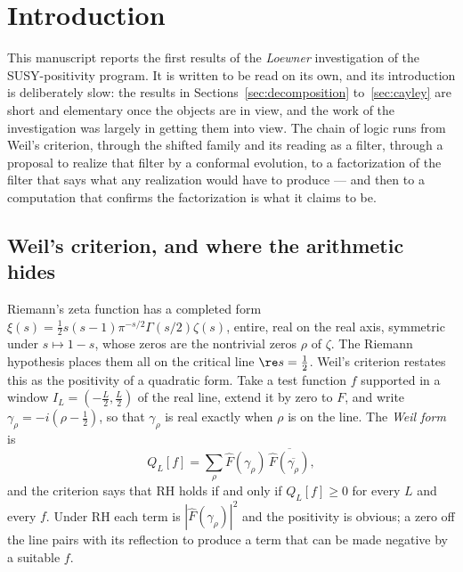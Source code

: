 \section{Introduction}\label{sec:intro}

This manuscript reports the first results of the \emph{Loewner} investigation
of the SUSY-positivity program. It is written to be read on its own, and its
introduction is deliberately slow: the results in Sections~\ref{sec:decomposition}
to~\ref{sec:cayley} are short and elementary once the objects are in
view, and the work of the investigation was largely in getting them into view.
The chain of logic runs from Weil's criterion, through the shifted family and
its reading as a filter, through a proposal to realize that filter by a
conformal evolution, to a factorization of the filter that says what any
realization would have to produce --- and then to a computation that confirms
the factorization is what it claims to be.

\subsection{Weil's criterion, and where the arithmetic hides}

Riemann's zeta function has a completed form
$\xi(s)=\frac12s(s-1)\pi^{-s/2}\Gamma(s/2)\zeta(s)$, entire, real on the real
axis, symmetric under $s\mapsto1-s$, whose zeros are the nontrivial zeros
$\rho$ of $\zeta$. The Riemann hypothesis places them all on the critical line
$\re s=\frac12$. Weil's criterion restates this as the positivity of a
quadratic form. Take a test function $f$ supported in a window
$I_L=(-\frac L2,\frac L2)$ of the real line, extend it by zero to $F$, and
write $\gamma_\rho=-i(\rho-\frac12)$, so that $\gamma_\rho$ is real exactly when
$\rho$ is on the line. The \emph{Weil form} is
\begin{equation}\label{eq:intro-spectral}
 Q_L[f]=\sum_\rho\widehat F(\gamma_\rho)\,\overline{\widehat F(\overline{\gamma_\rho})},
\end{equation}
and the criterion says that RH holds if and only if $Q_L[f]\geq0$ for every
$L$ and every $f$. Under RH each term is $|\widehat F(\gamma_\rho)|^2$ and the
positivity is obvious; a zero off the line pairs with its reflection to produce
a term that can be made negative by a suitable $f$.

